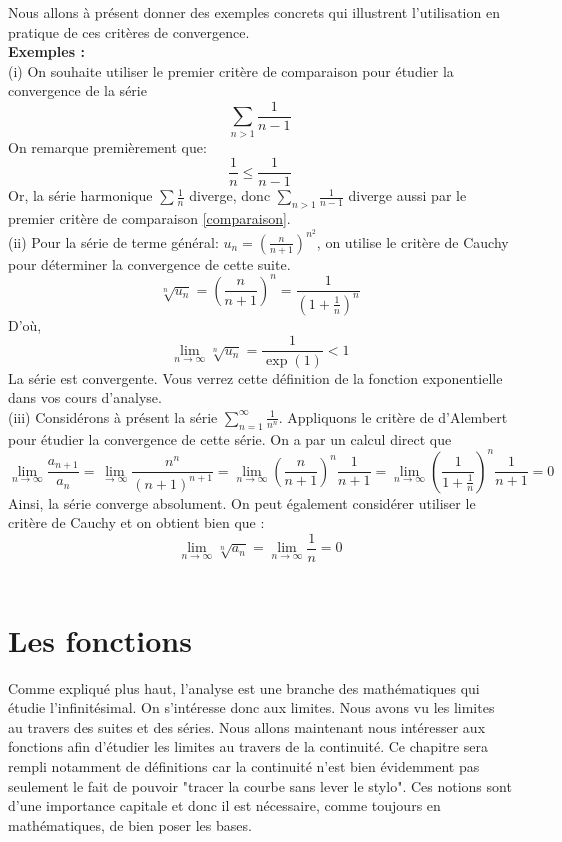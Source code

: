 \documentclass[oneside,12pt,french,table]{book}
\theoremstyle{definition}
\theoremstyle{plain}
\theoremstyle{remark}
\begin{document}
Nous allons à présent donner des exemples concrets qui illustrent l'utilisation en pratique de ces critères de convergence. \\
\textbf{Exemples :}
\\ (i) On souhaite utiliser le premier critère de comparaison pour étudier la convergence de la série 
\begin{equation*}
    \sum_{n> 1} \frac{1}{n-1}
\end{equation*}
On remarque premièrement que: 
\begin{equation*}
    \frac{1}{n}\leq \frac{1}{n-1}
\end{equation*}
Or, la série harmonique $\sum\frac{1}{n}$ diverge, donc $\underset{n> 1}{\sum}\frac{1}{n-1}$ diverge aussi par le premier critère de comparaison \ref{comparaison}. \\
(ii) Pour la série de terme général: $u_n=\left(\frac{n}{n+1}\right)^{n^2}$, on utilise le critère de Cauchy pour déterminer la convergence de cette suite.
\begin{equation*}
    \sqrt[n]{u_n}=\left( \frac{n}{n+1} \right)^n=\frac{1}{\left(1+\frac{1}{n}\right)^n }
\end{equation*}
D'où, $$\lim_{n\rightarrow\infty} \sqrt[n]{u_n}=\frac{1}{\exp(1)}<1$$
La série est convergente. Vous verrez cette définition de la fonction exponentielle dans vos cours d'analyse.
\\
(iii) Considérons à présent la série $ \sum_{n=1}^{\infty} \frac{1}{n^n}$.
Appliquons le critère de d'Alembert pour étudier la convergence de cette série. 
On a par un calcul direct  que  $$ \lim_{n\to \infty} \frac{a_{n+1}}{a_n} =\lim_{\to \infty} \frac{n^n}{(n+1)^{n+1}} = \lim_{ n \to \infty}\left ( \frac{n}{n+1} \right )^n \frac{1}{n+1} = \lim_{ n \to \infty} \left ( \frac{1}{1 + \frac{1}{n}} \right )^n \frac{1}{n+1} = 0  $$
Ainsi, la série converge absolument. 
On peut également considérer utiliser le critère de Cauchy et on obtient bien que : 
$$\lim_{n\to \infty} \sqrt[n]{a_n} = \lim_{n\to \infty} \frac{1}{n} = 0 $$
\\









\chapter{Les fonctions}
Comme expliqué plus haut, l'analyse est une branche des mathématiques qui étudie l'infinitésimal. On s'intéresse donc aux limites. Nous avons vu les limites au travers des suites et des séries. Nous allons maintenant nous intéresser aux fonctions afin d'étudier les limites au travers de la continuité. Ce chapitre sera rempli notamment de définitions car la continuité n'est bien évidemment pas seulement le fait de pouvoir "tracer la courbe sans lever le stylo". Ces notions sont d'une importance capitale et donc il est nécessaire, comme toujours en mathématiques, de bien poser les bases.
\end{document}
